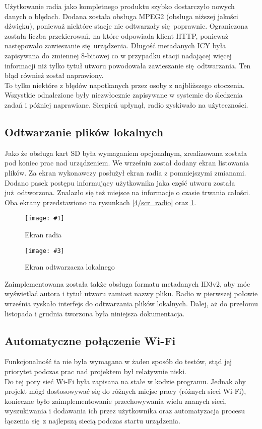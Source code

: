 \documentclass[polish]{aghengthesis}
\newcommand{\imgintss}[5]{
	\begin{figure}[{#5}]
		\centering
		\begin{minipage}{.45\textwidth}
			\centering
			\texttt{[image: \#1]}
			\caption{#2}
			\label{#1}
		\end{minipage}%
		\hfill
		\begin{minipage}{.45\textwidth}
			\centering
			\texttt{[image: \#3]}
			\caption{#4}
			\label{#3}
		\end{minipage}
	\end{figure}
}
\newcommand{\imghss}[4]{\imgintss{#1}{#2}{#3}{#4}{H}}
\begin{document}
			Użytkowanie radia jako kompletnego produktu szybko dostarczyło nowych danych o błędach. Dodana została obsługa MPEG2 (obsługa niższej jakości dźwięku), ponieważ niektóre stacje nie odtwarzały się poprawnie. Ograniczona została liczba przekierowań, na które odpowiada klient HTTP, ponieważ następowało zawieszanie się urządzenia. Długość metadanych ICY była zapisywana do zmiennej 8-bitowej co w przypadku stacji nadającej więcej informacji niż tylko tytuł utworu powodowała zawieszanie się odtwarzania. Ten błąd również został naprawiony.
			$ $\\
			
			To tylko niektóre z błędów napotkanych przez osoby z najbliższego otoczenia. Wszystkie odnalezione były niezwłocznie zapisywane w systemie do śledzenia zadań i później naprawiane. Sierpień upłynął, radio zyskiwało na użyteczności.
			
		\subsection{Odtwarzanie plików lokalnych}
			Jako że obsługa kart SD była wymaganiem opcjonalnym, zrealizowana została pod koniec prac nad urządzeniem. We wrześniu został dodany ekran listowania plików. Za ekran wykonawczy posłużył ekran radia z pomniejszymi zmianami. Dodano pasek postępu informujący użytkownika jaka część utworu została już odtworzona. Znalazło się też miejsce na informacje o czasie trwania całości. Oba ekrany przedstawiono na rysunkach \ref{4/scr_radio} oraz \ref{4/scr_player}.
			
			\imghss{4/scr_radio}{Ekran radia}{4/scr_player}{Ekran odtwarzacza lokalnego}
			
			Zaimplementowana została także obsługa formatu metadanych ID3v2, aby móc wyświetlać autora i tytuł utworu zamiast nazwy pliku. Radio w pierwszej połowie września zyskało interfejs do odtwarzania plików lokalnych. Dalej, aż do przełomu listopada i grudnia tworzona była niniejsza dokumentacja.
			
		\subsection{Automatyczne połączenie Wi-Fi}
			Funkcjonalność ta nie była wymagana w żaden sposób do testów, stąd jej priorytet podczas prac nad projektem był relatywnie niski. 
			$ $\\

			 Do tej pory sieć Wi-Fi była zapisana na stałe w kodzie programu.  Jednak aby projekt mógł dostosowywać się do różnych miejsc pracy (różnych sieci Wi-Fi), konieczne było zaimplementowanie przechowywania wielu znanych sieci, wyszukiwania i dodawania ich przez użytkownika oraz automatyzacja procesu łączenia się z najlepszą siecią podczas startu urządzenia.
			 $ $\\
			 
\end{document}
